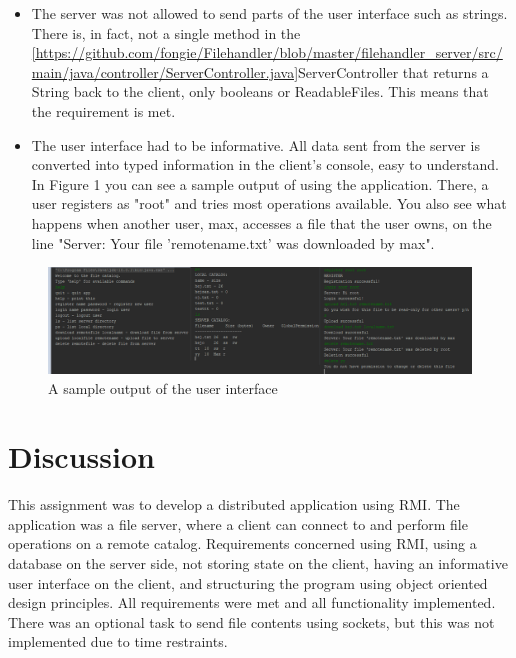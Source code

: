 \documentclass[a4paper]{scrartcl}
\begin{document}
\begin{itemize}
    \item The server was not allowed to send parts of the user interface such as strings. There is, in fact, not a single method in the \ref{https://github.com/fongie/Filehandler/blob/master/filehandler_server/src/main/java/controller/ServerController.java}{ServerController} that returns a String back to the client, only booleans or ReadableFiles. This means that the requirement is met.

    \item The user interface had to be informative. All data sent from the server is converted into typed information in the client's console, easy to understand. In Figure 1 you can see a sample output of using the application. There, a user registers as "root" and tries most operations available. You also see what happens when another user, max, accesses a file that the user owns, on the line "Server: Your file 'remotename.txt' was downloaded by max".

\end{itemize}

\begin{figure}[h!]
    \begin{center}
        \includegraphics[scale=0.41]{ui.png}
        \caption{A sample output of the user interface}
        \label{fig:ui}
    \end{center}
\end{figure}



\section{Discussion}

This assignment was to develop a distributed application using RMI. The application was a file server, where a client can connect to and perform file operations on a remote catalog. Requirements concerned using RMI, using a database on the server side, not storing state on the client, having an informative user interface on the client, and structuring the program using object oriented design principles. All requirements were met and all functionality implemented. There was an optional task to send file contents using sockets, but this was not implemented due to time restraints.
\end{document}
